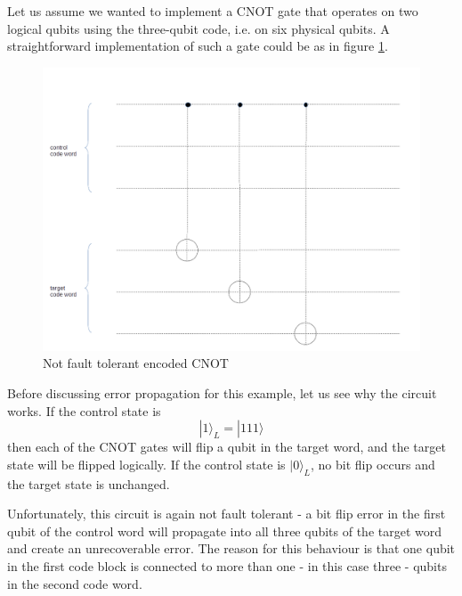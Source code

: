 \documentclass[a4paper, draft]{article}
\theoremstyle{own}
\theoremstyle{remark}
\begin{document}
Let us assume we wanted to implement a CNOT gate that operates on two logical qubits using the three-qubit code, i.e. on six physical qubits. A straightforward implementation of such a gate could be as in figure \ref{fig:EncodedCNOT_One}.

\begin{figure}[ht]
\centering
\includegraphics[width=0.7\linewidth]{images/EncodedCNOT_One}
\caption[Not fault tolerant encoded CNOT]{Not fault tolerant encoded CNOT}
\label{fig:EncodedCNOT_One}
\end{figure}

Before discussing error propagation for this example, let us see why the circuit works. If the control state is 
$$
|1 \rangle_L = |111 \rangle
$$
then each of the CNOT gates will flip a qubit in the target word, and the target state will be flipped logically. If the control state is $|0 \rangle_L$, no bit flip occurs and the target state is unchanged.

Unfortunately, this circuit is again not fault tolerant - a bit flip error in the first qubit of the control word will propagate into all three qubits of the target word and create an unrecoverable error. The reason for this behaviour is that one qubit in the first code block is connected to more than one - in this case three - qubits in the second code word. 
\end{document}
